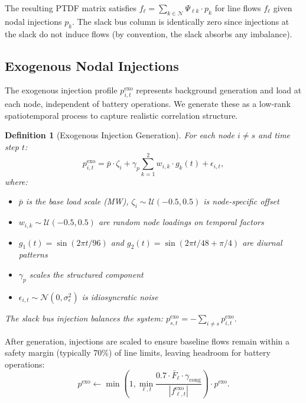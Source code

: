 \documentclass[11pt]{article}
\newtheorem{definition}{Definition}
\begin{document}
The resulting PTDF matrix satisfies $f_\ell = \sum_{k \in \mathcal{N}} \Psi_{\ell k} \cdot p_k$ for line flows $f_\ell$ given nodal injections $p_k$. The slack bus column is identically zero since injections at the slack do not induce flows (by convention, the slack absorbs any imbalance).

\subsection{Exogenous Nodal Injections}

The exogenous injection profile $p^{\text{exo}}_{i,t}$ represents background generation and load at each node, independent of battery operations. We generate these as a low-rank spatiotemporal process to capture realistic correlation structure.

\begin{definition}[Exogenous Injection Generation]
For each node $i \neq s$ and time step $t$:
\begin{equation}
    p^{\text{exo}}_{i,t} = \bar{p} \cdot \zeta_i + \gamma_p \sum_{k=1}^{2} w_{i,k} \cdot g_k(t) + \epsilon_{i,t},
\end{equation}
where:
\begin{itemize}
    \item $\bar{p}$ is the base load scale (MW), $\zeta_i \sim \mathcal{U}(-0.5, 0.5)$ is node-specific offset
    \item $w_{i,k} \sim \mathcal{U}(-0.5, 0.5)$ are random node loadings on temporal factors
    \item $g_1(t) = \sin(2\pi t / 96)$ and $g_2(t) = \sin(2\pi t / 48 + \pi/4)$ are diurnal patterns
    \item $\gamma_p$ scales the structured component
    \item $\epsilon_{i,t} \sim \mathcal{N}(0, \sigma^2_\epsilon)$ is idiosyncratic noise
\end{itemize}
The slack bus injection balances the system: $p^{\text{exo}}_{s,t} = -\sum_{i \neq s} p^{\text{exo}}_{i,t}$.
\end{definition}

After generation, injections are scaled to ensure baseline flows remain within a safety margin (typically 70\%) of line limits, leaving headroom for battery operations:
\begin{equation}
    p^{\text{exo}} \gets \min\left(1, \min_{\ell, t} \frac{0.7 \cdot \bar{F}_\ell \cdot \gamma_{\text{cong}}}{|f^{\text{exo}}_{\ell,t}|}\right) \cdot p^{\text{exo}}.
\end{equation}
\end{document}
